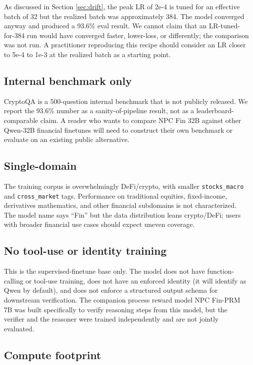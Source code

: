 \documentclass[10pt,letterpaper]{article}
\begin{document}
As discussed in Section \ref{sec:drift}, the peak LR of 2e-4 is tuned for an effective batch of 32 but the realized batch was approximately 384. The model converged anyway and produced a 93.6\% eval result. We cannot claim that an LR-tuned-for-384 run would have converged faster, lower-loss, or differently; the comparison was not run. A practitioner reproducing this recipe should consider an LR closer to 5e-4 to 1e-3 at the realized batch as a starting point.

\subsection{Internal benchmark only}

CryptoQA is a 500-question internal benchmark that is not publicly released. We report the 93.6\% number as a sanity-of-pipeline result, not as a leaderboard-comparable claim. A reader who wants to compare NPC Fin 32B against other Qwen-32B financial finetunes will need to construct their own benchmark or evaluate on an existing public alternative.

\subsection{Single-domain}

The training corpus is overwhelmingly DeFi/crypto, with smaller \texttt{stocks\_macro} and \texttt{cross\_market} tags. Performance on traditional equities, fixed-income, derivatives mathematics, and other financial subdomains is not characterized. The model name says ``Fin'' but the data distribution leans crypto/DeFi; users with broader financial use cases should expect uneven coverage.

\subsection{No tool-use or identity training}

This is the supervised-finetune base only. The model does not have function-calling or tool-use training, does not have an enforced identity (it will identify as Qwen by default), and does not enforce a structured output schema for downstream verification. The companion process reward model NPC Fin-PRM 7B \cite{bachu2026cheapprms} was built specifically to verify reasoning steps from this model, but the verifier and the reasoner were trained independently and are not jointly evaluated.

\subsection{Compute footprint}
\end{document}
